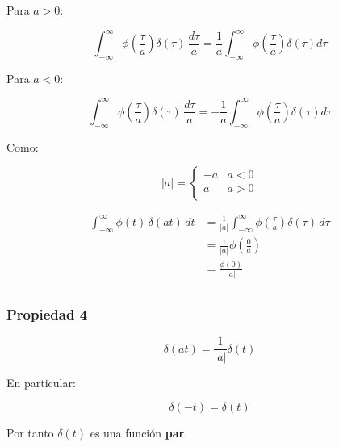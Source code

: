 Para $a>0$:

\begin{equation*}
    \int_{-\infty}^{\infty}
        \phi\left(\frac{\tau}{a}\right)\delta(\tau)\,\frac{d\tau}{a}
        =\frac{1}{a}\int_{-\infty}^{\infty}
            \phi\left(\frac{\tau}{a}\right)\delta(\tau)d\tau
\end{equation*}

Para $a<0$:

\begin{equation*}
    \int_{-\infty}^{\infty}
        \phi\left(\frac{\tau}{a}\right)\delta(\tau)\,\frac{d\tau}{a}
        =-\frac{1}{a}\int_{-\infty}^{\infty}
            \phi\left(\frac{\tau}{a}\right)\delta(\tau)d\tau
\end{equation*}

Como:

\begin{equation*}
    |a|=\begin{cases}
        -a & a<0 \\
         a & a>0 \\
    \end{cases}
\end{equation*}

\begin{equation*}
\begin{split}
    \int_{-\infty}^{\infty}\phi(t)\,\delta(at)\,dt
        &=\frac{1}{|a|}\int_{-\infty}^{\infty}
            \phi\left(\frac{\tau}{a}\right)\delta(\tau)\,d\tau\\
        &=\frac{1}{|a|}\phi\left(\frac{0}{a}\right)\\
        &=\frac{\phi(0)}{|a|}\\
\end{split}
\end{equation*}

\subsubsection*{Propiedad 4}

\begin{equation*}
    \delta(at)=\frac{1}{|a|}\delta(t)
\end{equation*}

En particular:

\begin{equation*}
    \delta(-t)=\delta(t)
\end{equation*}

Por tanto $\delta(t)$ es una función \textbf{par}.

